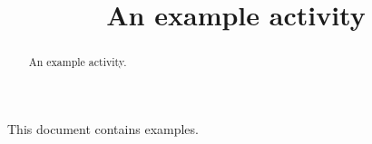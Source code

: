 \documentclass{ximera}
\title{An example activity}
\begin{document}
\begin{abstract}
  An example activity.
\end{abstract}
\maketitle

This document contains examples. 
\end{document}
